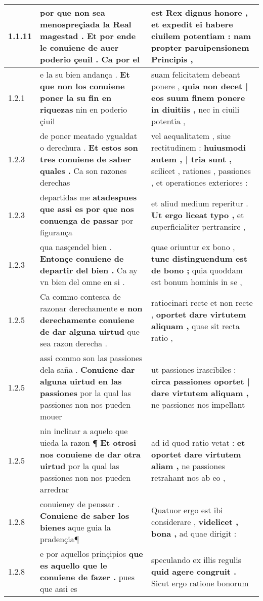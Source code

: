 \begin{tabular}{|p{1cm}|p{6.5cm}|p{6.5cm}|}
1.1.11 & por que non sea menospreçiada la Real magestad . \textbf{ Et por ende le conuiene de auer poderio çeuil . } Ca por el & est Rex dignus honore , \textbf{ et expedit ei habere ciuilem potentiam : } nam propter paruipensionem Principis , \\\hline
1.2.1 & e la su bien andança . \textbf{ Et que non los conuiene poner la su fin en riquezas } nin en poderio çiuil & suam felicitatem debeant ponere , \textbf{ quia non decet | eos suum finem ponere in diuitiis , } nec in ciuili potentia , \\\hline
1.2.3 & de poner meatado ygualdat o derechura . \textbf{ Et estos son tres conuiene de saber quales . } Ca son razones derechas & vel aequalitatem , siue rectitudinem : \textbf{ huiusmodi autem , | tria sunt , } scilicet , rationes , passiones , et operationes exteriores : \\\hline
1.2.3 & departidas me \textbf{ atadespues que assi es por que nos conuenga de passar } por figurança & et aliud medium reperitur . \textbf{ Ut ergo liceat typo , } et superficialiter pertransire , \\\hline
1.2.3 & qua nasçendel bien . \textbf{ Entonçe conuiene de departir del bien . } Ca ay vn bien del omne en si . & quae oriuntur ex bono , \textbf{ tunc distinguendum est de bono ; } quia quoddam est bonum hominis in se , \\\hline
1.2.5 & Ca commo contesca de razonar derechamente \textbf{ e non derechamente conuiene de dar alguna uirtud } que sea razon derecha . & ratiocinari recte et non recte , \textbf{ oportet dare virtutem aliquam , } quae sit recta ratio , \\\hline
1.2.5 & assi commo son las passiones dela saña . \textbf{ Conuiene dar alguna uirtud en las passiones } por la qual las passiones non nos pueden mouer & ut passiones irascibiles : \textbf{ circa passiones oportet | dare virtutem aliquam , } ne passiones nos impellant \\\hline
1.2.5 & nin inclinar a aquelo que uieda la razon ¶ \textbf{ Et otrosi nos conuiene de dar otra uirtud } por la qual las passiones non nos pueden arredrar & ad id quod ratio vetat : \textbf{ et oportet dare virtutem aliam , } ne passiones retrahant nos ab eo , \\\hline
1.2.8 & conuieney de penssar . \textbf{ Conuiene de saber los bienes } aque guia la pradençia¶ & Quatuor ergo est ibi considerare , \textbf{ videlicet , bona , } ad quae dirigit : \\\hline
1.2.8 & e por aquellos prinçipios \textbf{ que es aquello que le conuiene de fazer . } pues que assi es & speculando ex illis regulis \textbf{ quid agere congruit . } Sicut ergo ratione bonorum \\\hline

\end{tabular}
